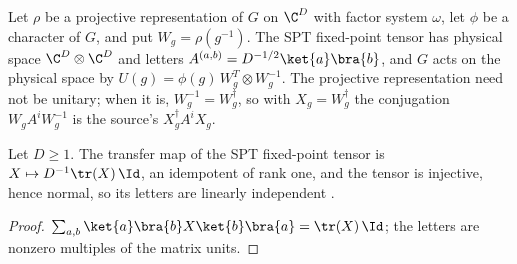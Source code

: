 \begin{definition}
    \label{def:spt_fixed_point_tensor}
    \leanok
    Let $\rho$ be a projective representation of $G$ on $\C^D$ with factor system
    $\omega$, let $\phi$ be a character of $G$, and put $W_g=\rho(g^{-1})$.  The
    SPT fixed-point tensor has physical space $\C^D\otimes\C^D$ and letters
    $A^{(a,b)}=D^{-1/2}\ket{a}\bra{b}$, and $G$ acts on the physical space by
    $U(g)=\phi(g)\,W_g^{T}\otimes W_g^{-1}$.  The projective representation
    need not be unitary; when it is, $W_g^{-1}=W_g^{\dagger}$, so with
    $X_g=W_g^{\dagger}$ the conjugation $W_gA^iW_g^{-1}$ is the source's
    $X_g^{\dagger}A^iX_g$.
\end{definition}

\begin{lemma}
    \label{thm:spt_fixed_point_transfer}
    \leanok
    Let $D\geq1$.  The transfer map of the SPT fixed-point tensor is
    $X\mapsto D^{-1}\tr(X)\,\Id$, an idempotent of rank one, and the tensor is
    injective, hence normal, so its letters are linearly independent
    \cite[Section~III.A]{Cirac2021Matrix}.
\end{lemma}

\begin{proof}\leanok
    $\sum_{a,b}\ket{a}\bra{b}X\ket{b}\bra{a}=\tr(X)\,\Id$; the letters are nonzero
    multiples of the matrix units.
\end{proof}

